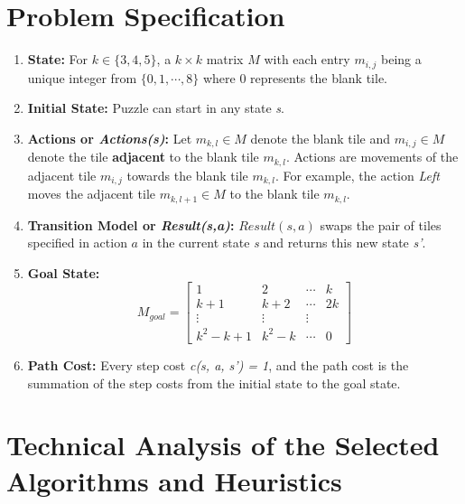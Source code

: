 \documentclass[runningheads]{llncs}
\begin{document}
\section{Problem Specification}
\begin{enumerate}
    \item \textbf{State:} For \( k \in \{3, 4, 5\} \),  a \( k \times k \) matrix \( M \) with each entry \( m_{i, j} \) being a unique integer from \( \{0, 1, \cdots, 8 \} \) where 0 represents the blank tile.
    \item \textbf{Initial State:} Puzzle can start in any state \textit{s}.
    \item \textbf{Actions or \textit{Actions(s)}:} Let \( m_{k, l} \in M \) denote the blank tile and \( m_{i, j} \in M \) denote the tile \textbf{adjacent} to the blank tile \( m_{k, l} \).
    Actions are movements of the adjacent tile \( m_{i, j} \) towards the blank tile \( m_{k, l} \). For example, the action \textit{Left} moves the adjacent tile \( m_{k, l+1} \in M \) to the blank tile \( m_{k, l} \).
    \item \textbf{Transition Model or \textit{Result(s,a)}:} \( Result(s, a) \) swaps the pair of tiles specified in action \( a \) in the current state \textit{s} and returns this new state \textit{s'}.
    \item \textbf{Goal State:} 
    \[
    M_{goal}= \begin{bmatrix}
        1 & 2 & \cdots & k \\
        k+1 & k+2 & \cdots & 2k \\
        \vdots & \vdots & \vdots \\
        k^2 - k + 1 & k^2 - k & \cdots & 0
        \end{bmatrix}
    \]
    \item \textbf{Path Cost:} Every step cost \textit{c(s, a, s') = 1}, and the path cost is the summation of the step costs from the initial state to the goal state.
\end{enumerate}

\section{Technical Analysis of the Selected Algorithms and Heuristics}
\label{section2}
\end{document}
